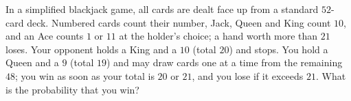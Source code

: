 In a simplified blackjack game, all cards are dealt face up from a standard $52$-card deck. Numbered cards count their number, Jack, Queen and King count $10$, and an Ace counts $1$ or $11$ at the holder's choice; a hand worth more than $21$ loses. Your opponent holds a King and a $10$ (total $20$) and stops. You hold a Queen and a $9$ (total $19$) and may draw cards one at a time from the remaining $48$; you win as soon as your total is $20$ or $21$, and you lose if it exceeds $21$. What is the probability that you win?
